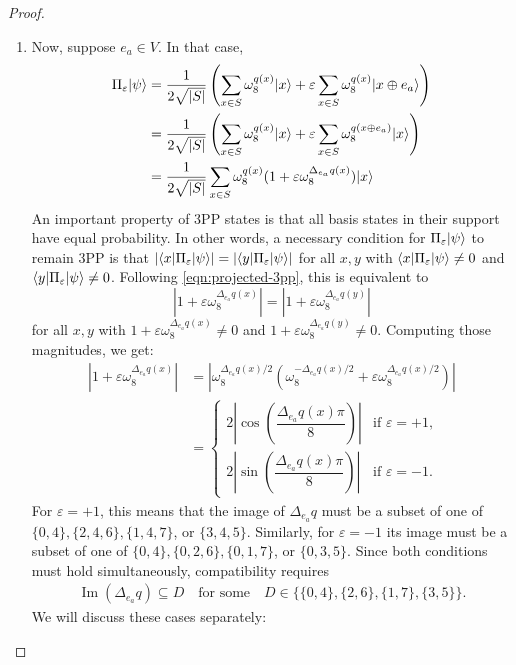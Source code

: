 \begin{proof}
\begin{enumerate}
\item
Now, suppose $e_a \in V$.
In that case,
\begin{align}
    \Pi_\varepsilon \ket{\psi}
    &= \frac{1}{2\sqrt{|S|}} \left( \sum_{x\in S} \omega_8^{q(x)}\ket{x} + \varepsilon\sum_{x\in S} \omega_8^{q(x)}\ket{x \oplus e_a} \right) \\
    &= \frac{1}{2\sqrt{|S|}} \left( \sum_{x\in S} \omega_8^{q(x)}\ket{x} + \varepsilon\sum_{x\in S} \omega_8^{q(x \oplus e_a)}\ket{x} \right) \\
    &= \frac{1}{2\sqrt{|S|}} \sum_{x\in S} \omega_8^{q(x)} (1 + \varepsilon\omega_8^{\Delta_{e_a}q(x)}) \ket{x}  \label{eqn:projected-3pp}
\end{align}
An important property of 3PP states is that all basis states in their support have equal probability.
In other words, a necessary condition for $\Pi_\varepsilon \ket{\psi}$ to remain 3PP is that  $|\bra{x}\Pi_\varepsilon \ket{\psi}| = |\bra{y}\Pi_\varepsilon \ket{\psi}|$ for all $x,y$ with $\bra{x}\Pi_\varepsilon \ket{\psi} \neq 0$ and $\bra{y}\Pi_\varepsilon \ket{\psi} \neq 0$.
Following \cref{eqn:projected-3pp}, this is equivalent to
\[
    \left|1 + \varepsilon\omega_8^{\Delta_{e_a}q(x)}\right| = \left|1 + \varepsilon\omega_8^{\Delta_{e_a}q(y)}\right|
\]
for all $x,y$ with $1 + \varepsilon\omega_8^{\Delta_{e_a}q(x)} \neq 0$ and $1 + \varepsilon\omega_8^{\Delta_{e_a}q(y)} \neq 0$.
Computing those magnitudes, we get:
\begin{align*}
    \left| 1 + \varepsilon\omega_8^{\Delta_{e_a}q(x)} \right| &=
    \left| \omega_8^{\Delta_{e_a} q(x) / 2} \left( \omega_8^{-\Delta_{e_a} q(x) / 2} + \varepsilon\omega_8^{\Delta_{e_a} q(x) / 2} \right) \right| \\
    &= \begin{cases}
        2 \left| \cos \left(\dfrac{\Delta_{e_a} q(x) \pi}{8} \right) \right| & \text{if } \varepsilon = +1, \\
        2 \left| \sin \left(\dfrac{\Delta_{e_a} q(x) \pi}{8} \right) \right| & \text{if } \varepsilon = -1.
    \end{cases}
\end{align*}
For $\varepsilon = +1$, this means that the image of $\Delta_{e_a}q$ must be a subset of one of $\{0, 4\}, \{2,4,6\}, \{1,4,7\}$, or $\{3,4,5\}$.
Similarly, for $\varepsilon = -1$ its image must be a subset of one of $\{0, 4\}, \{0,2,6\}, \{0,1,7\}$, or $\{0,3,5\}$.
Since both conditions must hold simultaneously, compatibility requires
\begin{align} \label{eqn:gradient-two-valued}
    \operatorname{Im}(\Delta_{e_a}q)\subseteq D
    \quad\text{for some}\quad
    D\in\bigl\{\{0,4\},\{2,6\},\{1,7\},\{3,5\}\bigr\}.
\end{align}
We will discuss these cases separately:


\end{enumerate}
\end{proof}
